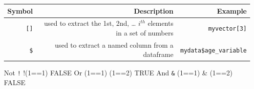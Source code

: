 \documentclass[]{book}
\begin{document}
\begin{longtable}[]{@{}rrr@{}}
\toprule
\begin{minipage}[b]{0.30\columnwidth}\raggedleft
Symbol\strut
\end{minipage} & \begin{minipage}[b]{0.30\columnwidth}\raggedleft
Description\strut
\end{minipage} & \begin{minipage}[b]{0.30\columnwidth}\raggedleft
Example\strut
\end{minipage}\tabularnewline
\midrule
\endhead
\begin{minipage}[t]{0.30\columnwidth}\raggedleft
\texttt{{[}{]}}\strut
\end{minipage} & \begin{minipage}[t]{0.30\columnwidth}\raggedleft
used to extract the 1st, 2nd, \ldots{} \(i^{th}\) elements in a set of numbers\strut
\end{minipage} & \begin{minipage}[t]{0.30\columnwidth}\raggedleft
\texttt{myvector{[}3{]}}\strut
\end{minipage}\tabularnewline
\begin{minipage}[t]{0.30\columnwidth}\raggedleft
\texttt{\$}\strut
\end{minipage} & \begin{minipage}[t]{0.30\columnwidth}\raggedleft
used to extract a named column from a dataframe\strut
\end{minipage} & \begin{minipage}[t]{0.30\columnwidth}\raggedleft
\texttt{mydata\$age\_variable}\strut
\end{minipage}\tabularnewline
\bottomrule
\end{longtable}

Not \textbar{} \texttt{!} \textbar{} !(1==1) \textbar{} FALSE
Or \textbar{} \texttt{\textbar{}} \textbar{} (1==1) \textbar{} (1==2) \textbar{} TRUE
And \textbar{} \texttt{\&} \textbar{} (1==1) \& (1==2) \textbar{} FALSE


\end{document}
